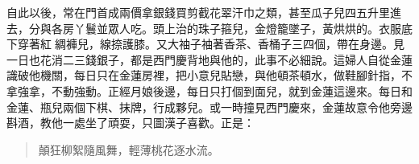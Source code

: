 自此以後，常在門首成兩價拿銀錢買剪截花翠汗巾之類，甚至瓜子兒四五升里進去，分與各房丫鬟並眾人吃。頭上治的珠子箍兒，金燈籠墜子，黃烘烘的。衣服底下穿著紅𫄉綢褲兒，線捺護膝。又大袖子袖著香茶、香桶子三四個，帶在身邊。見一日也花消二三錢銀子，都是西門慶背地與他的，此事不必細說。這婦人自從金蓮識破他機關，每日只在金蓮房裡，把小意兒貼戀，與他頓茶頓水，做鞋腳針指，不拿強拿，不動強動。正經月娘後邊，每日只打個到面兒，就到金蓮這邊來。每日和金蓮、瓶兒兩個下棋、抹牌，行成夥兒。或一時撞見西門慶來，金蓮故意令他旁邊斟酒，教他一處坐了頑耍，只圖漢子喜歡。正是：
\begin{quote}
顛狂柳絮隨風舞，輕薄桃花逐水流。
\end{quote}
